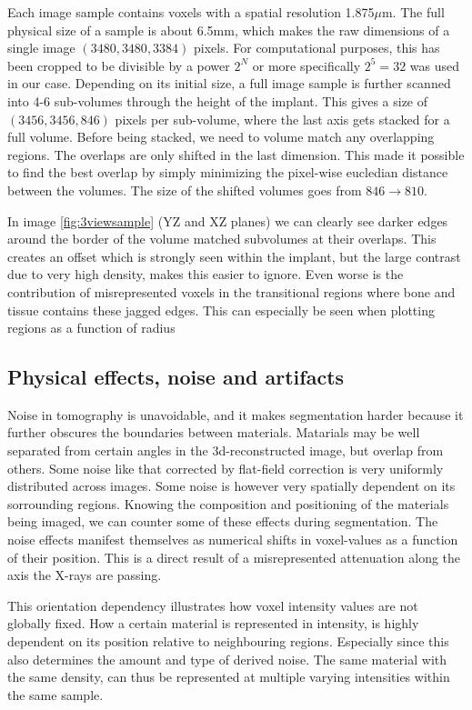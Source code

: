 Each image sample contains voxels with a spatial resolution 1.875$\mu$m. The full physical size of
a sample is about 6.5mm, which makes the raw dimensions of a single image $(3480,3480,3384)$ pixels.
For computational purposes, this has been cropped to be divisible by a power $2^N$ or more
specifically $2^5=32$ was used in our case. Depending on its initial size, a full image sample is
further scanned into 4-6 sub-volumes through the height of the implant. This gives a size of
$(3456,3456,846)$ pixels per sub-volume, where the last axis gets stacked for a full volume. Before
being stacked, we need to volume match any overlapping regions. The overlaps are only shifted in the
last dimension. This made it possible to find the best overlap by simply minimizing the pixel-wise
eucledian distance between the volumes. The size of the shifted volumes goes from $846 \rightarrow 810$.

In image \cref{fig:3viewsample} (YZ and XZ planes) we can clearly see darker edges around the border
of the volume matched subvolumes at their overlaps. This creates an offset which is strongly seen
within the implant, but the large contrast due to very high density, makes this easier to ignore.
Even worse is the contribution of misrepresented voxels in the transitional regions where bone and
tissue contains these jagged edges. This can especially be seen when plotting regions as a function
of radius 

\subsection{Physical effects, noise and artifacts}
\label{sec:physics}

Noise in tomography is unavoidable, and it makes segmentation harder because it further obscures
the boundaries between materials. Matarials may be well separated from certain angles in the
3d-reconstructed image, but overlap from others. Some noise like that corrected by flat-field
correction is very uniformly distributed across images. Some noise is however very spatially
dependent on its sorrounding regions. Knowing the composition and positioning of the materials
being imaged, we can counter some of these effects during segmentation. The noise effects manifest
themselves as numerical shifts in voxel-values as a function of their position. This is a direct
result of a misrepresented attenuation along the axis the X-rays are passing.

This orientation dependency illustrates how voxel intensity values are not globally fixed. How a
certain material is represented in intensity, is highly dependent on its position relative to
neighbouring regions. Especially since this also determines the amount and type of derived noise. 
The same material with the same density, can thus be represented at multiple varying intensities
within the same sample.

